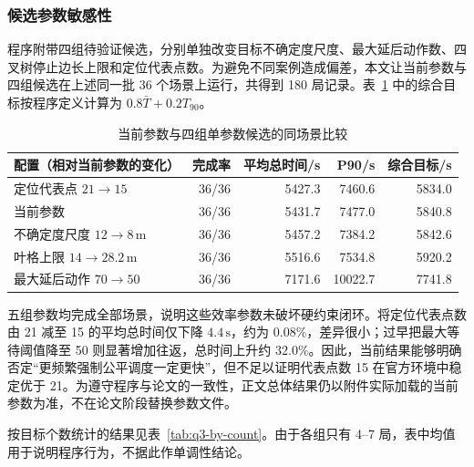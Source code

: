 \subsubsection{候选参数敏感性}

程序附带四组待验证候选，分别单独改变目标不确定度尺度、最大延后动作数、四叉树停止边长上限和定位代表点数。为避免不同案例造成偏差，本文让当前参数与四组候选在上述同一批 36 个场景上运行，共得到 180 局记录。表~\ref{tab:q3-candidates} 中的综合目标按程序定义计算为 $0.8\bar T+0.2T_{90}$。

\begin{table}[htbp]
  \centering
  \caption{当前参数与四组单参数候选的同场景比较}
  \label{tab:q3-candidates}
  \begin{tabular}{lrrrr}
    \toprule
    配置（相对当前参数的变化） & 完成率 & 平均总时间/s & P90/s & 综合目标/s\\
    \midrule
    定位代表点 $21\to15$ & 36/36 & 5427.3 & 7460.6 & 5834.0\\
    当前参数 & 36/36 & 5431.7 & 7477.0 & 5840.8\\
    不确定度尺度 $12\to8\,\mathrm m$ & 36/36 & 5457.2 & 7384.2 & 5842.6\\
    叶格上限 $14\to28.2\,\mathrm m$ & 36/36 & 5516.6 & 7534.8 & 5920.2\\
    最大延后动作 $70\to50$ & 36/36 & 7171.6 & 10022.7 & 7741.8\\
    \bottomrule
  \end{tabular}
\end{table}

五组参数均完成全部场景，说明这些效率参数未破坏硬约束闭环。将定位代表点数由 21 减至 15 的平均总时间仅下降 $4.4\,\mathrm s$，约为 $0.08\%$，差异很小；过早把最大等待阈值降至 50 则显著增加往返，总时间上升约 $32.0\%$。因此，当前结果能够明确否定“更频繁强制公平调度一定更快”，但不足以证明代表点数 15 在官方环境中稳定优于 21。为遵守程序与论文的一致性，正文总体结果仍以附件实际加载的当前参数为准，不在论文阶段替换参数文件。

按目标个数统计的结果见表~\ref{tab:q3-by-count}。由于各组只有 4--7 局，表中均值用于说明程序行为，不据此作单调性结论。

